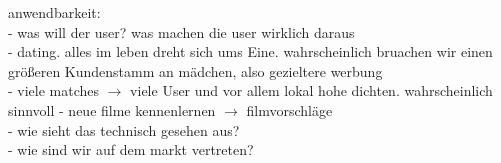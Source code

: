 

anwendbarkeit:\\
- was will der user? was machen die user wirklich daraus\\
\hspace{1cm} - dating. alles im leben dreht sich ums Eine. wahrscheinlich bruachen wir einen größeren Kundenstamm an mädchen, also gezieltere werbung\\
\hspace{1cm} - viele matches $\rightarrow$ viele User und vor allem lokal hohe dichten. wahrscheinlich sinnvoll
\hspace{1cm} - neue filme kennenlernen $\rightarrow$  filmvorschläge\\
- wie sieht das technisch gesehen aus?\\
- wie sind wir auf dem markt vertreten?\\

